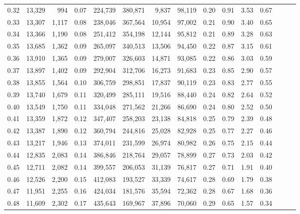 \begin{tabular}{rrrrrrrrrrrrrrr}
0.32 &  13,329 &    994 &  0.07 &  224,739 &  380,871 &    9,837 &   98,119 &  0.20 &  0.91 &  3.53 &      0.67 \\
0.33 &  13,307 &  1,117 &  0.08 &  238,046 &  367,564 &   10,954 &   97,002 &  0.21 &  0.90 &  3.40 &      0.65 \\
0.34 &  13,366 &  1,190 &  0.08 &  251,412 &  354,198 &   12,144 &   95,812 &  0.21 &  0.89 &  3.28 &      0.63 \\
0.35 &  13,685 &  1,362 &  0.09 &  265,097 &  340,513 &   13,506 &   94,450 &  0.22 &  0.87 &  3.15 &      0.61 \\
0.36 &  13,910 &  1,365 &  0.09 &  279,007 &  326,603 &   14,871 &   93,085 &  0.22 &  0.86 &  3.03 &      0.59 \\
0.37 &  13,897 &  1,402 &  0.09 &  292,904 &  312,706 &   16,273 &   91,683 &  0.23 &  0.85 &  2.90 &      0.57 \\
0.38 &  13,855 &  1,564 &  0.10 &  306,759 &  298,851 &   17,837 &   90,119 &  0.23 &  0.83 &  2.77 &      0.55 \\
0.39 &  13,740 &  1,679 &  0.11 &  320,499 &  285,111 &   19,516 &   88,440 &  0.24 &  0.82 &  2.64 &      0.52 \\
0.40 &  13,549 &  1,750 &  0.11 &  334,048 &  271,562 &   21,266 &   86,690 &  0.24 &  0.80 &  2.52 &      0.50 \\
0.41 &  13,359 &  1,872 &  0.12 &  347,407 &  258,203 &   23,138 &   84,818 &  0.25 &  0.79 &  2.39 &      0.48 \\
0.42 &  13,387 &  1,890 &  0.12 &  360,794 &  244,816 &   25,028 &   82,928 &  0.25 &  0.77 &  2.27 &      0.46 \\
0.43 &  13,217 &  1,946 &  0.13 &  374,011 &  231,599 &   26,974 &   80,982 &  0.26 &  0.75 &  2.15 &      0.44 \\
0.44 &  12,835 &  2,083 &  0.14 &  386,846 &  218,764 &   29,057 &   78,899 &  0.27 &  0.73 &  2.03 &      0.42 \\
0.45 &  12,711 &  2,082 &  0.14 &  399,557 &  206,053 &   31,139 &   76,817 &  0.27 &  0.71 &  1.91 &      0.40 \\
0.46 &  12,526 &  2,200 &  0.15 &  412,083 &  193,527 &   33,339 &   74,617 &  0.28 &  0.69 &  1.79 &      0.38 \\
0.47 &  11,951 &  2,255 &  0.16 &  424,034 &  181,576 &   35,594 &   72,362 &  0.28 &  0.67 &  1.68 &      0.36 \\
0.48 &  11,609 &  2,302 &  0.17 &  435,643 &  169,967 &   37,896 &   70,060 &  0.29 &  0.65 &  1.57 &      0.34 \\

\end{tabular}
